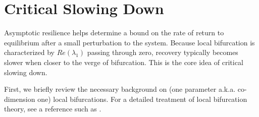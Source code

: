 \section{Critical Slowing Down}
\label{sec:csd}

Asymptotic resilience helps determine a bound on the rate of return to equilibrium after a small perturbation to the system. Because local bifurcation is characterized by $Re(\lambda_1)$ passing through zero, recovery typically becomes slower when closer to the verge of bifurcation. This is the core idea of critical slowing down. %

%




First, we briefly review the necessary background on (one parameter a.k.a. co-dimension one) local bifurcations. For a detailed treatment of local bifurcation theory, see a reference such as . %

